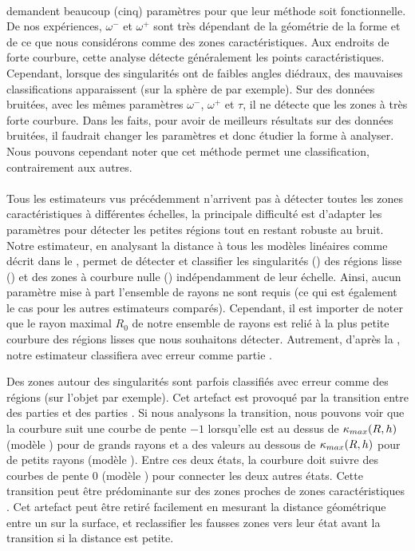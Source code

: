\paragraph{}
%
 demandent beaucoup (cinq) paramètres pour que leur méthode soit fonctionnelle. De
nos expériences, $\omega^-$ et $\omega^+$ sont très dépendant de la géométrie de
la forme et de ce que nous considérons comme des zones caractéristiques. Aux
endroits de forte courbure, cette analyse détecte généralement les points
caractéristiques. Cependant, lorsque des singularités ont de faibles angles
diédraux, des mauvaises classifications apparaissent (sur la sphère de
\CubeSphere par exemple). Sur des données bruitées, avec les mêmes
paramètres $\omega^-$, $\omega^+$ et $\tau$, il ne détecte que les zones à très
forte courbure. Dans les faits, pour avoir de meilleurs résultats sur des
données bruitées, il faudrait changer les paramètres et donc étudier la forme à
analyser. Nous pouvons cependant noter que cet méthode permet une
classification, contrairement aux autres.
%
\paragraph{}
%
Tous les estimateurs vus précédemment n'arrivent pas à détecter toutes les zones
caractéristiques à différentes échelles, la principale difficulté est d'adapter
les paramètres pour détecter les petites régions tout en restant robuste au
bruit. Notre estimateur, en analysant la distance à tous les modèles linéaires
comme décrit dans le ,
permet de détecter et classifier les singularités (\featedge) des régions lisse
(\featsmooth) et des zones à courbure nulle (\featflat) indépendamment de leur
échelle. Ainsi, aucun paramètre mise à part l'ensemble de rayons ne sont requis
(ce qui est également le cas pour les autres estimateurs comparés). Cependant,
il est importer de noter que le rayon maximal $R_0$ de notre ensemble de rayons
est relié à la plus petite courbure des régions lisses que nous souhaitons
détecter. Autrement, d'après la , notre estimateur
classifiera avec erreur comme partie \featflat.


Des zones autour des singularités sont parfois classifiés avec erreur
comme des régions \featsmooth (sur l'objet \CubeSphere par exemple). Cet
artefact est provoqué par la transition entre des parties \featflat et des
parties \featedge. Si nous analysons la transition, nous pouvons voir que la
courbure suit une courbe de pente $-1$ lorsqu'elle est au dessus de
$\kappa_{max}(R,h)$ (modèle \featedge) pour de grands rayons et a des valeurs au
dessous de $\kappa_{max}(R,h)$ pour de petits rayons (modèle \featflat). Entre ces
deux états, la courbure doit suivre des courbes de pente $0$ (modèle
\featsmooth) pour connecter les deux autres états. Cette transition peut être
prédominante sur des zones proches de zones caractéristiques \featedge. Cet
artefact peut être retiré facilement en mesurant la distance géométrique entre
un \featedge sur la surface, et reclassifier les fausses zones \featsmooth vers
leur état avant la transition si la distance est petite.


